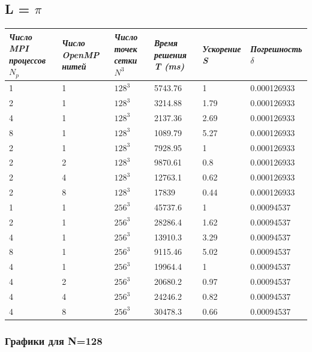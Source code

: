 \documentclass[a4paper,hidelinks,12pt]{article}
\begin{document}
\newpage
\subsection{L = $\pi$}

{
\centering
\noindent\begin{tabular}{|p{2cm}|p{2cm}|p{2.5cm}|p{2.5cm}|p{2cm}|p{2.5cm}|}
    \hline
    \textit{Число MPI процессов }$N_p$ & \textit{Число OpenMP нитей} & \textit{Число точек сетки }$N^3$ & \textit{Время решения T (ms)} & \textit{Ускорение S} & \textit{Погрешность }$\delta$ \\
    \hline
    1 & 1 & $128^3$ & 5743.76 & 1 & 0.000126933 \\
    2 & 1 & $128^3$ & 3214.88 & 1.79 & 0.000126933 \\
    4 & 1 & $128^3$ & 2137.36 & 2.69 & 0.000126933 \\
    8 & 1 & $128^3$ & 1089.79 & 5.27 & 0.000126933 \\
    \hline
    2 & 1 & $128^3$ & 7928.95 & 1 & 0.000126933 \\
    2 & 2 & $128^3$ & 9870.61 & 0.8 & 0.000126933 \\
    2 & 4 & $128^3$ & 12763.1 & 0.62 & 0.000126933 \\
    2 & 8 & $128^3$ & 17839 & 0.44 & 0.000126933 \\
    \hline
    \hline
    1 & 1 & $256^3$ & 45737.6 & 1 & 0.00094537 \\
    2 & 1 & $256^3$ & 28286.4 & 1.62 & 0.00094537 \\
    4 & 1 & $256^3$ & 13910.3 & 3.29 & 0.00094537 \\
    8 & 1 & $256^3$ & 9115.46 & 5.02 & 0.00094537 \\
    \hline
    4 & 1 & $256^3$ & 19964.4 & 1 & 0.00094537 \\
    4 & 2 & $256^3$ & 20680.2 & 0.97 & 0.00094537 \\
    4 & 4 & $256^3$ & 24246.2 & 0.82 & 0.00094537 \\
    4 & 8 & $256^3$ & 30478.3 & 0.66 & 0.00094537 \\
    \hline
    
\end{tabular}
}

\subsubsection{Графики для N=128}
\end{document}

